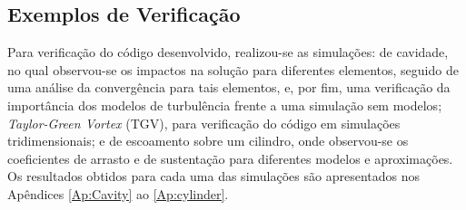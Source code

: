 \subsection{Exemplos de Verificação} \label{ExemplosMT}

Para verificação do código desenvolvido, realizou-se as simulações: de cavidade, no qual observou-se os impactos na solução para diferentes elementos, seguido de uma análise da convergência para tais elementos, e, por fim, uma verificação da importância dos modelos de turbulência frente a uma simulação sem modelos; \textit{Taylor-Green Vortex} (TGV), para verificação do código em simulações tridimensionais; e de escoamento sobre um cilindro, onde observou-se os coeficientes de arrasto e de sustentação para diferentes modelos e aproximações. Os resultados obtidos para cada uma das simulações são apresentados nos Apêndices \ref{Ap:Cavity} ao \ref{Ap:cylinder}.
